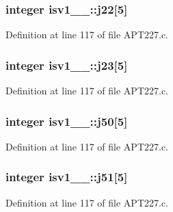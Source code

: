 \subsubsection[{\texorpdfstring{j22}{j22}}]{\setlength{\rightskip}{0pt plus 5cm}integer isv1\+\_\+\_\+\+::j22\mbox{[}5\mbox{]}}\hypertarget{structisv1__1___af6d64208f7cc0a693ccc42917bf832cd}{}\label{structisv1__1___af6d64208f7cc0a693ccc42917bf832cd}


Definition at line 117 of file A\+P\+T227.\+c.

\subsubsection[{\texorpdfstring{j23}{j23}}]{\setlength{\rightskip}{0pt plus 5cm}integer isv1\+\_\+\_\+\+::j23\mbox{[}5\mbox{]}}\hypertarget{structisv1__1___a0bb1aacdec3d08893d8c5f3eda4e6336}{}\label{structisv1__1___a0bb1aacdec3d08893d8c5f3eda4e6336}


Definition at line 117 of file A\+P\+T227.\+c.

\subsubsection[{\texorpdfstring{j50}{j50}}]{\setlength{\rightskip}{0pt plus 5cm}integer isv1\+\_\+\_\+\+::j50\mbox{[}5\mbox{]}}\hypertarget{structisv1__1___a2e8005681f2327331cabcc7934518cc3}{}\label{structisv1__1___a2e8005681f2327331cabcc7934518cc3}


Definition at line 117 of file A\+P\+T227.\+c.

\subsubsection[{\texorpdfstring{j51}{j51}}]{\setlength{\rightskip}{0pt plus 5cm}integer isv1\+\_\+\_\+\+::j51\mbox{[}5\mbox{]}}\hypertarget{structisv1__1___aaf07f7705181ca3a63c970978de75ded}{}\label{structisv1__1___aaf07f7705181ca3a63c970978de75ded}


Definition at line 117 of file A\+P\+T227.\+c.

